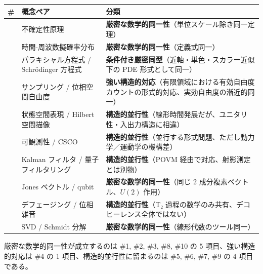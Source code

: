 \documentclass[
]{ltjsarticle}
\newcounter{none} %
\begin{document}
{\def\LTcaptype{none} %
\begin{longtable}[]{@{}
  >{\raggedright\arraybackslash}p{}
  >{\raggedright\arraybackslash}p{}
  >{\raggedright\arraybackslash}p{}@{}}
\toprule\noalign{}
\begin{minipage}[b]{\linewidth}\raggedright
\#
\end{minipage} & \begin{minipage}[b]{\linewidth}\raggedright
概念ペア
\end{minipage} & \begin{minipage}[b]{\linewidth}\raggedright
分類
\end{minipage} \\
\midrule\noalign{}
\endhead
\bottomrule\noalign{}
\endlastfoot
1 & 不確定性原理 &
\textbf{厳密な数学的同一性}（単位スケール除き同一定理） \\
2 & 時間-周波数擬確率分布 & \textbf{厳密な数学的同一性}（定義式同一） \\
3 & パラキシャル方程式 / Schrödinger 方程式 &
\textbf{条件付き厳密同型}（近軸・単色・スカラー近似下の PDE
形式として同一） \\
4 & サンプリング / 位相空間自由度 &
\textbf{強い構造的対応}（有限領域における有効自由度カウントの形式的対応、実効自由度の漸近的同一） \\
5 & 状態空間表現 / Hilbert 空間描像 &
\textbf{構造的並行性}（線形時間発展だが、ユニタリ性・入出力構造に相違） \\
6 & 可観測性 / CSCO &
\textbf{構造的並行性}（並行する形式問題、ただし動力学／運動学の機構差） \\
7 & Kalman フィルタ / 量子フィルタリング & \textbf{構造的並行性}（POVM
経由で対応、射影測定とは別物） \\
8 & Jones ベクトル / qubit & \textbf{厳密な数学的同一性}（同じ 2
成分複素ベクトル、\(U(2)\) 作用） \\
9 & デフェージング / 位相雑音 & \textbf{構造的並行性}（T₂
過程の数学のみ共有、デコヒーレンス全体ではない） \\
10 & SVD / Schmidt 分解 &
\textbf{厳密な数学的同一性}（線形代数のツール同一） \\
\end{longtable}
}

厳密な数学的同一性が成立するのは \#1, \#2, \#3, \#8, \#10 の 5
項目、強い構造的対応は \#4 の 1 項目、構造的並行性に留まるのは \#5, \#6,
\#7, \#9 の 4 項目である。
\end{document}

